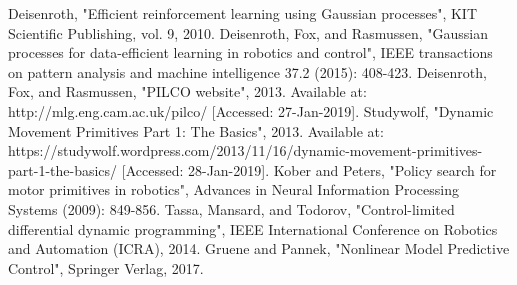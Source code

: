 \documentclass[letterpaper, 10 pt, conference]{ieeeconf}  %
\begin{document}
\begin{thebibliography}{99}

 Deisenroth, "Efficient reinforcement learning using Gaussian processes", KIT Scientific Publishing, vol. 9, 2010.
 Deisenroth, Fox, and Rasmussen, "Gaussian processes for data-efficient learning in robotics and control", IEEE transactions on pattern analysis and machine intelligence 37.2 (2015): 408-423.
 Deisenroth, Fox, and Rasmussen, "PILCO website", 2013. Available at: http://mlg.eng.cam.ac.uk/pilco/ [Accessed: 27-Jan-2019].
 Studywolf, "Dynamic Movement Primitives Part 1: The Basics", 2013. Available at: https://studywolf.wordpress.com/2013/11/16/dynamic-movement-primitives-part-1-the-basics/ [Accessed: 28-Jan-2019].
 Kober and Peters, "Policy search for motor primitives in robotics", Advances in Neural Information Processing Systems (2009): 849-856.
 Tassa, Mansard, and Todorov, "Control-limited differential dynamic programming", IEEE International Conference on Robotics and Automation (ICRA), 2014.
 Gruene and Pannek, "Nonlinear Model Predictive Control", Springer Verlag, 2017.


\end{thebibliography}
\end{document}
